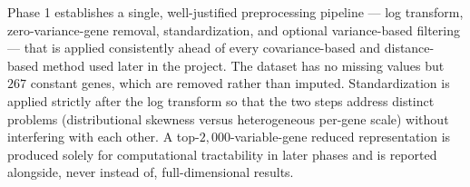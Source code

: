\documentclass[11pt]{article}
\begin{document}
Phase 1 establishes a single, well-justified preprocessing pipeline ---
log transform, zero-variance-gene removal, standardization, and optional
variance-based filtering --- that is applied consistently ahead of every
covariance-based and distance-based method used later in the project.
The dataset has no missing values but $267$ constant genes, which are
removed rather than imputed. Standardization is applied strictly after
the log transform so that the two steps address distinct problems
(distributional skewness versus heterogeneous per-gene scale) without
interfering with each other. A top-$2{,}000$-variable-gene reduced
representation is produced solely for computational tractability in later
phases and is reported alongside, never instead of, full-dimensional
results.
\end{document}
